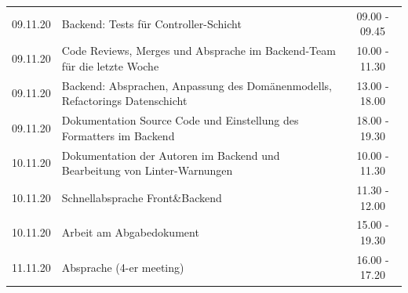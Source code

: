 \begin{longtable}{cp{}c}
    09.11.20 & Backend: Tests für Controller-Schicht                                           & 09.00 - 09.45           \\
    09.11.20 & Code Reviews, Merges und Absprache im Backend-Team für die letzte Woche         & 10.00 - 11.30           \\
    09.11.20 & Backend: Absprachen, Anpassung des Domänenmodells, Refactorings Datenschicht    & 13.00 - 18.00           \\
    09.11.20 & Dokumentation Source Code und Einstellung des Formatters im Backend             & 18.00 - 19.30           \\
    10.11.20 & Dokumentation der Autoren im Backend und Bearbeitung von Linter-Warnungen       & 10.00 - 11.30           \\
    10.11.20 & Schnellabsprache Front\&Backend                                                 & 11.30 - 12.00           \\
    10.11.20 & Arbeit am Abgabedokument                                                        & 15.00 - 19.30           \\
    11.11.20 & Absprache (4-er meeting)                                                        & 16.00 - 17.20 
    \\*
    \end{longtable}



